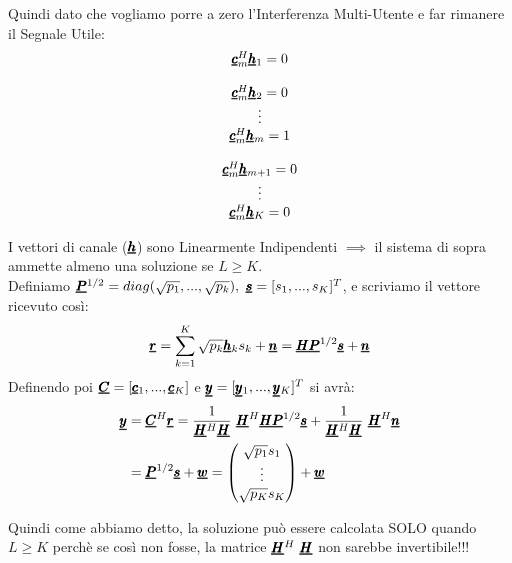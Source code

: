 Quindi dato che vogliamo porre a zero l'Interferenza Multi-Utente e far rimanere il Segnale Utile:
\begin{equation*}
    \begin{matrix}
    \pmb{\underline{c}}_m^H \pmb{\underline{h}}_1 = 0 \\ \\
    \pmb{\underline{c}}_m^H \pmb{\underline{h}}_2 = 0 \\ 
    \vdots\\ 
    \pmb{\underline{c}}_m^H \pmb{\underline{h}}_m = 1 \\ \\
    \pmb{\underline{c}}_m^H \pmb{\underline{h}}_{m+1} = 0 \\ 
    \vdots \\ 
    \pmb{\underline{c}}_m^H \pmb{\underline{h}}_K = 0
    \end{matrix}
\end{equation*}

I vettori di canale ($\pmb{\underline{h}}$) sono Linearmente Indipendenti $\implies$ il sistema di sopra ammette almeno una soluzione se $L \geq K$.\\

Definiamo $\pmb{\underline{P}}^{1/2} = diag(\sqrt{p_1},...,\sqrt{p_k}), \ \pmb{\underline{s}} = [s_1,...,s_K]^T$, e scriviamo il vettore ricevuto così:
\begin{equation*}
    \pmb{\underline{r}} = \sum_{k=1}^K \sqrt{p_k} \pmb{\underline{h}}_k s_k + \pmb{\underline{n}} = \pmb{\underline{H}} \pmb{\underline{P}}^{1/2} \pmb{\underline{s}} + \pmb{\underline{n}}
\end{equation*}
Definendo poi $\pmb{\underline{C}} = [\pmb{\underline{c}}_1,...,\pmb{\underline{c}}_K]$ e $\pmb{\underline{y}} = [\pmb{\underline{y}}_1,...,\pmb{\underline{y}}_K]^T$ si avrà:
\begin{equation*}
\begin{aligned}
    \vc{y} &= \vc{C}^H \vc{r} = \frac{1}{\vc{H}^H \vc{H}} \ \vc{H}^H  \vc{H} \vc{P}^{1/2} \vc{s} + \frac{1}{\vc{H}^H \vc{H}} \ \vc{H}^H  \vc{n} \\
    &= \vc{P}^{1/2} \vc{s} + \vc{w} = \begin{pmatrix}
    \sqrt{p_1} s_1 \\
     \vdots \\
    \sqrt{p_K} s_K
    \end{pmatrix}
    + \vc{w}
\end{aligned}
\end{equation*}

Quindi come abbiamo detto, la soluzione può essere calcolata SOLO quando $L \geq K$ perchè se così non fosse, la matrice $\pmb{\underline{H}}^H \ \pmb{\underline{H}}$ non sarebbe invertibile!!! \\

